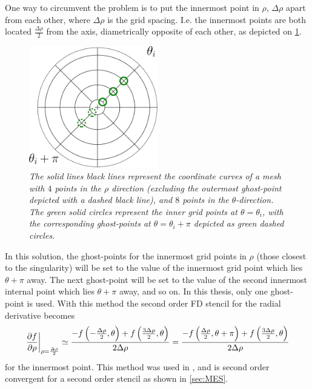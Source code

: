One way to circumvent the problem is to put the innermost point in $\rho$, $\Delta \rho$ apart from each other, where $\Delta \rho$ is the grid spacing.
I.e. the innermost points are both located $\frac{\Delta \rho}{2}$ from the axis, diametrically opposite of each other, as depicted on \cref{fig:innerRho}.
%
\begin{figure}[htb]
    \centering
    \includegraphics[width=0.5\textwidth]{fig/innerGhost}
    \caption{\textit{
The solid lines black lines represent the coordinate curves of a mesh with $4$ points in the $\rho$ direction (excluding the outermost ghost-point depicted with a dashed black line), and $8$ points in the $\theta$-direction.
The green solid circles represent the inner grid points at $\theta=\theta_i$, with the corresponding ghost-points at $\theta=\theta_i + \pi$ depicted as green dashed circles.
    }}
    \label{fig:innerRho}
\end{figure}
%
In this solution, the ghost-points for the innermost grid points in $\rho$ (those closest to the singularity) will be set to the value of the innermost grid point which lies $\theta + \pi$ away.
The next ghost-point will be set to the value of the second innermost internal point which lies $\theta + \pi$ away, and so on.
In this thesis, only one ghost-point is used.
With this method the second order FD stencil for the radial derivative becomes
%
\begin{align*}
    \left.\frac{\partial {f}}{\partial{\rho}}\right|_{\rho=\frac{\Delta \rho}{2}} \simeq
    \frac{-f\left(-\frac{\Delta \rho}{2}, \theta\right) + f\left(\frac{3\Delta \rho}{2}, \theta\right)}{2\Delta \rho}
    =
    \frac{-f\left(\frac{\Delta \rho}{2}, \theta+\pi\right) + f\left(\frac{3\Delta \rho}{2}, \theta\right)}{2\Delta \rho}
\end{align*}
%
for the innermost point.
This method was used in \cite{Naulin2008}, and is second order convergent for a second order stencil as shown in \cref{sec:MES}.


